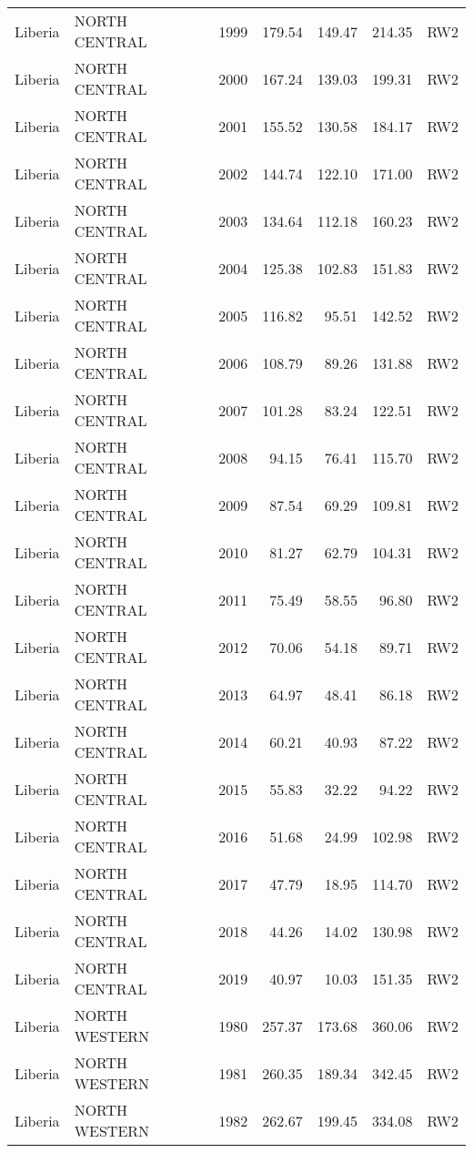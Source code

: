 \begin{longtable}{lllrrrl}
  Liberia & NORTH CENTRAL & 1999 & 179.54 & 149.47 & 214.35 & RW2 \\ 
  Liberia & NORTH CENTRAL & 2000 & 167.24 & 139.03 & 199.31 & RW2 \\ 
  Liberia & NORTH CENTRAL & 2001 & 155.52 & 130.58 & 184.17 & RW2 \\ 
  Liberia & NORTH CENTRAL & 2002 & 144.74 & 122.10 & 171.00 & RW2 \\ 
  Liberia & NORTH CENTRAL & 2003 & 134.64 & 112.18 & 160.23 & RW2 \\ 
  Liberia & NORTH CENTRAL & 2004 & 125.38 & 102.83 & 151.83 & RW2 \\ 
  Liberia & NORTH CENTRAL & 2005 & 116.82 & 95.51 & 142.52 & RW2 \\ 
  Liberia & NORTH CENTRAL & 2006 & 108.79 & 89.26 & 131.88 & RW2 \\ 
  Liberia & NORTH CENTRAL & 2007 & 101.28 & 83.24 & 122.51 & RW2 \\ 
  Liberia & NORTH CENTRAL & 2008 & 94.15 & 76.41 & 115.70 & RW2 \\ 
  Liberia & NORTH CENTRAL & 2009 & 87.54 & 69.29 & 109.81 & RW2 \\ 
  Liberia & NORTH CENTRAL & 2010 & 81.27 & 62.79 & 104.31 & RW2 \\ 
  Liberia & NORTH CENTRAL & 2011 & 75.49 & 58.55 & 96.80 & RW2 \\ 
  Liberia & NORTH CENTRAL & 2012 & 70.06 & 54.18 & 89.71 & RW2 \\ 
  Liberia & NORTH CENTRAL & 2013 & 64.97 & 48.41 & 86.18 & RW2 \\ 
  Liberia & NORTH CENTRAL & 2014 & 60.21 & 40.93 & 87.22 & RW2 \\ 
  Liberia & NORTH CENTRAL & 2015 & 55.83 & 32.22 & 94.22 & RW2 \\ 
  Liberia & NORTH CENTRAL & 2016 & 51.68 & 24.99 & 102.98 & RW2 \\ 
  Liberia & NORTH CENTRAL & 2017 & 47.79 & 18.95 & 114.70 & RW2 \\ 
  Liberia & NORTH CENTRAL & 2018 & 44.26 & 14.02 & 130.98 & RW2 \\ 
  Liberia & NORTH CENTRAL & 2019 & 40.97 & 10.03 & 151.35 & RW2 \\ 
  Liberia & NORTH WESTERN & 1980 & 257.37 & 173.68 & 360.06 & RW2 \\ 
  Liberia & NORTH WESTERN & 1981 & 260.35 & 189.34 & 342.45 & RW2 \\ 
  Liberia & NORTH WESTERN & 1982 & 262.67 & 199.45 & 334.08 & RW2 \\ 

\end{longtable}
